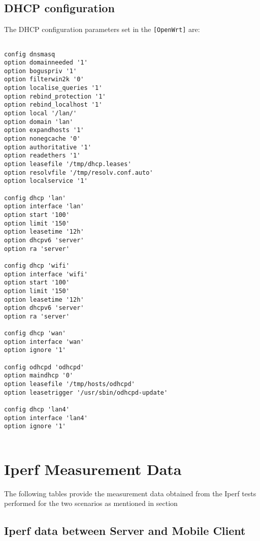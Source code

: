 \section{DHCP configuration}\label{app:sec:DHCP_config}
The DHCP configuration parameters set in the \verb|[OpenWrt]| are:
\begin{lstlisting}[frame=single]

config dnsmasq
option domainneeded '1'
option boguspriv '1'
option filterwin2k '0'
option localise_queries '1'
option rebind_protection '1'
option rebind_localhost '1'
option local '/lan/'
option domain 'lan'
option expandhosts '1'
option nonegcache '0'
option authoritative '1'
option readethers '1'
option leasefile '/tmp/dhcp.leases'
option resolvfile '/tmp/resolv.conf.auto'
option localservice '1'

config dhcp 'lan'
option interface 'lan'
option start '100'
option limit '150'
option leasetime '12h'
option dhcpv6 'server'
option ra 'server'

config dhcp 'wifi'
option interface 'wifi'
option start '100'
option limit '150'
option leasetime '12h'
option dhcpv6 'server'
option ra 'server'

config dhcp 'wan'
option interface 'wan'
option ignore '1'

config odhcpd 'odhcpd'
option maindhcp '0'
option leasefile '/tmp/hosts/odhcpd'
option leasetrigger '/usr/sbin/odhcpd-update'

config dhcp 'lan4'
option interface 'lan4'
option ignore '1'


\end{lstlisting}

\chapter{Iperf Measurement Data}\label{app:ch:measurement}

The following tables provide the measurement data obtained from the Iperf tests performed for the two scenarios as mentioned in section 

\section{Iperf data between Server and Mobile Client}\label{sec:iperf_data_mob_server}

